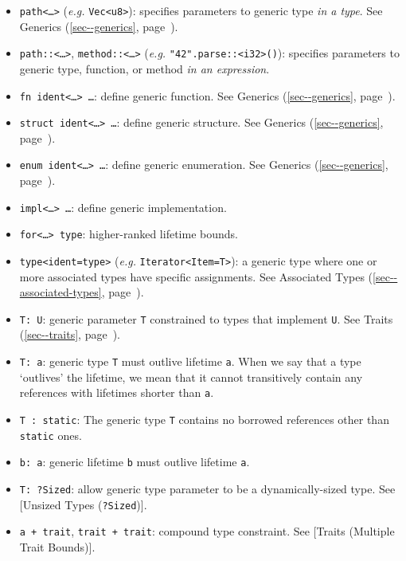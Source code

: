 \documentclass[a4paper,]{book}
\renewcommand*{\hyperlink}[2]{%
 #2 (\autoref{#1}, page~\pageref{#1})}
\providecommand{\tightlist}{%
  \setlength{\itemsep}{0pt}\setlength{\parskip}{0pt}}
\begin{document}
\begin{itemize}
\tightlist
\item
  \texttt{path\textless{}\ldots{}\textgreater{}} (\emph{e.g.}
  \texttt{Vec\textless{}u8\textgreater{}}): specifies parameters to
  generic type \emph{in a type}. See
  \protect\hyperlink{sec--generics}{Generics}.
\item
  \texttt{path::\textless{}\ldots{}\textgreater{}},
  \texttt{method::\textless{}\ldots{}\textgreater{}} (\emph{e.g.}
  \texttt{"42".parse::\textless{}i32\textgreater{}()}): specifies
  parameters to generic type, function, or method \emph{in an
  expression}.
\item
  \texttt{fn\ ident\textless{}\ldots{}\textgreater{}\ \ldots{}}: define
  generic function. See \protect\hyperlink{sec--generics}{Generics}.
\item
  \texttt{struct\ ident\textless{}\ldots{}\textgreater{}\ \ldots{}}:
  define generic structure. See
  \protect\hyperlink{sec--generics}{Generics}.
\item
  \texttt{enum\ ident\textless{}\ldots{}\textgreater{}\ \ldots{}}:
  define generic enumeration. See
  \protect\hyperlink{sec--generics}{Generics}.
\item
  \texttt{impl\textless{}\ldots{}\textgreater{}\ \ldots{}}: define
  generic implementation.
\item
  \texttt{for\textless{}\ldots{}\textgreater{}\ type}: higher-ranked
  lifetime bounds.
\item
  \texttt{type\textless{}ident=type\textgreater{}} (\emph{e.g.}
  \texttt{Iterator\textless{}Item=T\textgreater{}}): a generic type
  where one or more associated types have specific assignments. See
  \protect\hyperlink{sec--associated-types}{Associated Types}.
\end{itemize}

\begin{itemize}
\tightlist
\item
  \texttt{T:\ U}: generic parameter \texttt{T} constrained to types that
  implement \texttt{U}. See \protect\hyperlink{sec--traits}{Traits}.
\item
  \texttt{T:\ \textquotesingle{}a}: generic type \texttt{T} must outlive
  lifetime \texttt{\textquotesingle{}a}. When we say that a type
  `outlives' the lifetime, we mean that it cannot transitively contain
  any references with lifetimes shorter than
  \texttt{\textquotesingle{}a}.
\item
  \texttt{T\ :\ \textquotesingle{}static}: The generic type \texttt{T}
  contains no borrowed references other than
  \texttt{\textquotesingle{}static} ones.
\item
  \texttt{\textquotesingle{}b:\ \textquotesingle{}a}: generic lifetime
  \texttt{\textquotesingle{}b} must outlive lifetime
  \texttt{\textquotesingle{}a}.
\item
  \texttt{T:\ ?Sized}: allow generic type parameter to be a
  dynamically-sized type. See {[}Unsized Types (\texttt{?Sized}){]}.
\item
  \texttt{\textquotesingle{}a\ +\ trait}, \texttt{trait\ +\ trait}:
  compound type constraint. See {[}Traits (Multiple Trait Bounds){]}.
\end{itemize}
\end{document}
